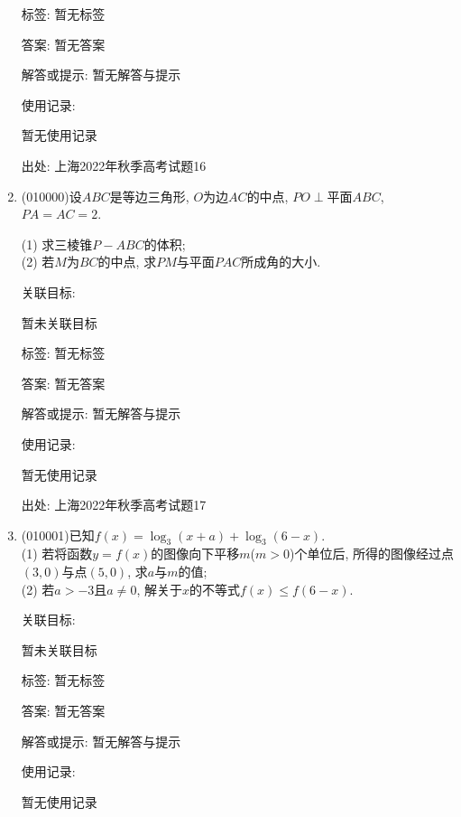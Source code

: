 \documentclass[10pt,a4paper]{article}
\begin{document}
\begin{enumerate}[1.]
标签: 暂无标签

答案: 暂无答案

解答或提示: 暂无解答与提示

使用记录:

暂无使用记录


出处: 上海2022年秋季高考试题16
\item { (010000)}设$ABC$是等边三角形, $O$为边$AC$的中点, $PO\perp$平面$ABC$, $PA=AC=2$.
\begin{center}
\end{center}
(1) 求三棱锥$P-ABC$的体积;\\
(2) 若$M$为$BC$的中点, 求$PM$与平面$PAC$所成角的大小.


关联目标:

暂未关联目标



标签: 暂无标签

答案: 暂无答案

解答或提示: 暂无解答与提示

使用记录:

暂无使用记录


出处: 上海2022年秋季高考试题17
\item { (010001)}已知$f(x)=\log_3(x+a)+\log_3(6-x)$.\\
(1) 若将函数$y=f(x)$的图像向下平移$m$($m>0$)个单位后, 所得的图像经过点$(3,0)$与点$(5,0)$, 求$a$与$m$的值;\\
(2) 若$a>-3$且$a\ne 0$, 解关于$x$的不等式$f(x)\le f(6-x)$.


关联目标:

暂未关联目标



标签: 暂无标签

答案: 暂无答案

解答或提示: 暂无解答与提示

使用记录:

暂无使用记录



\end{enumerate}
\end{document}
